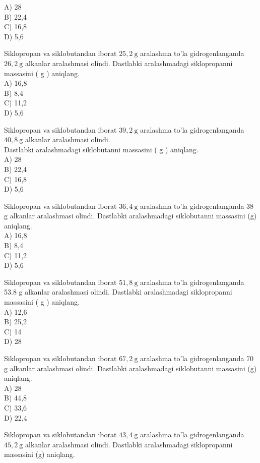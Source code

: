 A) 28\\
B) 22,4\\
C) 16,8\\
D) 5,6
  \item Siklopropan va siklobutandan iborat $25,2 \mathrm{~g}$ aralashma to'la gidrogenlanganda $26,2 \mathrm{~g}$ alkanlar aralashmasi olindi. Dastlabki aralashmadagi siklopropanni massasini ( g ) aniqlang.\\
A) 16,8\\
B) 8,4\\
C) 11,2\\
D) 5,6
  \item Siklopropan va siklobutandan iborat $39,2 \mathrm{~g}$ aralashma to'la gidrogenlanganda $40,8 \mathrm{~g}$ alkanlar aralashmasi olindi.\\
Dastlabki aralashmadagi siklobutanni massasini ( g ) aniqlang.\\
A) 28\\
B) 22,4\\
C) 16,8\\
D) 5,6
  \item Siklopropan va siklobutandan iborat $36,4 \mathrm{~g}$ aralashma to'la gidrogenlanganda 38 g alkanlar aralashmasi olindi. Dastlabki aralashmadagi siklobutanni massasini (g) aniqlang.\\
A) 16,8\\
B) 8,4\\
C) 11,2\\
D) 5,6
  \item Siklopropan va siklobutandan iborat $51,8 \mathrm{~g}$ aralashma to'la gidrogenlanganda 53.8 g alkanlar aralashmasi olindi. Dastlabki aralashmadagi siklopropanni massasini ( g ) aniqlang.\\
A) 12,6\\
B) 25,2\\
C) 14\\
D) 28
  \item Siklopropan va siklobutandan iborat $67,2 \mathrm{~g}$ aralashma to'la gidrogenlanganda 70 g alkanlar aralashmasi olindi. Dastlabki aralashmadagi siklobutanni massasini (g) aniqlang.\\
A) 28\\
B) 44,8\\
C) 33,6\\
D) 22,4
  \item Siklopropan va siklobutandan iborat $43,4 \mathrm{~g}$ aralashma to'la gidrogenlanganda $45,2 \mathrm{~g}$ alkanlar aralashmasi olindi. Dastlabki aralashmadagi siklopropanni massasini (g) aniqlang.\\
